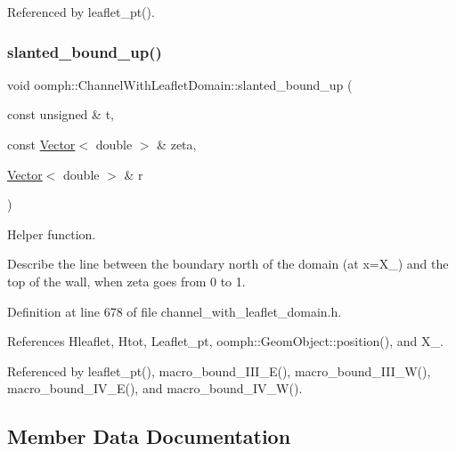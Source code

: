 Referenced by leaflet\+\_\+pt().

\mbox{\label{classoomph_1_1ChannelWithLeafletDomain_aaca0af9c2a638c80bd8af783b9972599}} 
\subsubsection{\texorpdfstring{slanted\+\_\+bound\+\_\+up()}{slanted\_bound\_up()}}
{\footnotesize\ttfamily void oomph\+::\+Channel\+With\+Leaflet\+Domain\+::slanted\+\_\+bound\+\_\+up (\begin{DoxyParamCaption}\item[{const unsigned \&}]{t,  }\item[{const \hyperlink{classoomph_1_1Vector}{Vector}$<$ double $>$ \&}]{zeta,  }\item[{\hyperlink{classoomph_1_1Vector}{Vector}$<$ double $>$ \&}]{r }\end{DoxyParamCaption})\hspace{0.3cm}{\ttfamily [protected]}}



Helper function. 

Describe the line between the boundary north of the domain (at x=X\+\_) and the top of the wall, when zeta goes from 0 to 1. 

Definition at line 678 of file channel\+\_\+with\+\_\+leaflet\+\_\+domain.\+h.



References Hleaflet, Htot, Leaflet\+\_\+pt, oomph\+::\+Geom\+Object\+::position(), and X\+\_.



Referenced by leaflet\+\_\+pt(), macro\+\_\+bound\+\_\+\+I\+I\+I\+\_\+\+E(), macro\+\_\+bound\+\_\+\+I\+I\+I\+\_\+\+W(), macro\+\_\+bound\+\_\+\+I\+V\+\_\+\+E(), and macro\+\_\+bound\+\_\+\+I\+V\+\_\+\+W().



\subsection{Member Data Documentation}
\mbox{\label{classoomph_1_1ChannelWithLeafletDomain_a75ce3248efae5c33a9c9989b2f310139}} 
